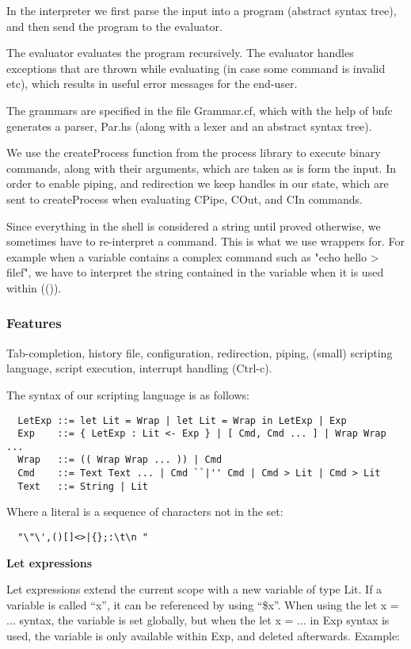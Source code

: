 \documentclass[11pt,a4paper]{article}
\begin{document}
In the interpreter we first parse the input into a program (abstract syntax
tree), and then send the program to the evaluator.

The evaluator evaluates the program recursively. The evaluator handles
exceptions that are thrown while evaluating (in case some command is invalid
etc), which results in useful error messages for the end-user.

The grammars are specified in the file Grammar.cf, which with the help of bnfc
generates a parser, Par.hs (along with a lexer and an abstract syntax tree).

We use the createProcess function from the process library to execute binary
commands, along with their arguments, which are taken as is form the input. In
order to enable piping, and redirection we keep handles in our state, which are
sent to createProcess when evaluating CPipe, COut, and CIn commands.

Since everything in the shell is considered a string until proved otherwise, we
sometimes have to re-interpret a command. This is what we use wrappers for.  For
example when a variable contains a complex command such as "echo hello > filef",
we have to interpret the string contained in the variable when it is used within
(()).

\subsubsection{Features}
\label{features}
Tab-completion, history file, configuration, redirection, piping, (small)
scripting language, script execution, interrupt handling (Ctrl-c).

The syntax of our scripting language is as follows:

\begin{verbatim}
  LetExp ::= let Lit = Wrap | let Lit = Wrap in LetExp | Exp
  Exp    ::= { LetExp : Lit <- Exp } | [ Cmd, Cmd ... ] | Wrap Wrap ...
  Wrap   ::= (( Wrap Wrap ... )) | Cmd
  Cmd    ::= Text Text ... | Cmd ``|'' Cmd | Cmd > Lit | Cmd > Lit
  Text   ::= String | Lit
\end{verbatim}

Where a literal is a sequence of characters not in the set:
\begin{verbatim}
  "\"\',()[]<>|{};:\t\n "
\end{verbatim}

\textbf{Let expressions}

Let expressions extend the current scope with a new variable of type Lit. If a
variable is called ``x'', it can be referenced by using ``\$x''.  When using the
let x = $\dots$ syntax, the variable is set globally, but when the let x =
$\dots$ in Exp syntax is used, the variable is only available within Exp, and
deleted afterwards. Example:
\end{document}
